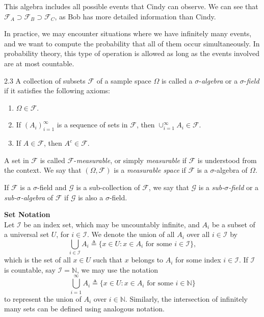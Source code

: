 This algebra includes all possible events that Cindy can observe. We can see that $\mathcal{F}_A \supset \mathcal{F}_B \supset \mathcal{F}_C$, as Bob has more detailed information than Cindy.

In practice, we may encounter situations where we have infinitely many events, and we want to compute the probability that all of them occur simultaneously. In probability theory, this type of operation is allowed as long as the events involved are at most countable.

\begin{defbox}{2.3}
A collection of subsets $\mathcal{F}$ of a sample space $\Omega$ is called a $\sigma$-\textit{algebra} or a $\sigma$-\textit{field} if it satisfies the following axioms:
\begin{enumerate}[label=\arabic*.]
    \item $\Omega\in \mathcal{F}$.
    \item If $(A_i)_{i=1}^{\infty}$ is a sequence of sets in $\mathcal{F}$, then $\cup_{i=1}^{\infty} A_i \in \mathcal{F}$.
    \item If $A\in \mathcal{F}$, then $A^c\in \mathcal{F}$.
\end{enumerate}

A set in $\mathcal{F}$ is called $\mathcal{F}$-\textit{measurable}, or simply \textit{measurable} if $\mathcal{F}$ is understood from the context. We say that $(\Omega,\mathcal{F})$ is a \textit{measurable space} if $\mathcal{F}$ is a $\sigma$-algebra of $\Omega$.

If $\mathcal{F}$ is a $\sigma$-field and $\mathcal{G}$ is a sub-collection of $\mathcal{F}$, we say that $\mathcal{G}$ is a \textit{sub-$\sigma$-field} or a \textit{sub-$\sigma$-algebra} of $\mathcal{F}$ if $\mathcal{G}$ is also a $\sigma$-field.
\end{defbox}

\textbf{Set Notation} \\
Let $\mathcal{I}$ be an index set, which may be uncountably infinite, and $A_i$ be a subset of a universal set $U$, for $i\in \mathcal{I}$. We denote the union of all $A_i$ over all $i\in \mathcal{I}$ by
\[
\bigcup_{i\in \mathcal{I}} A_i
\triangleq
\{x\in U : x\in A_i \text{ for some } i\in \mathcal{I}\},
\]
which is the set of all $x\in U$ such that $x$ belongs to $A_i$ for some index $i\in \mathcal{I}$. If $\mathcal{I}$ is countable, say $\mathcal{I}=\mathbb{N}$, we may use the notation
\[
\bigcup_{i=1}^{\infty} A_i
\triangleq
\{x\in U : x\in A_i \text{ for some } i\in \mathbb{N}\}
\]
to represent the union of $A_i$ over $i\in \mathbb{N}$. Similarly, the intersection of infinitely many sets can be defined using analogous notation.

